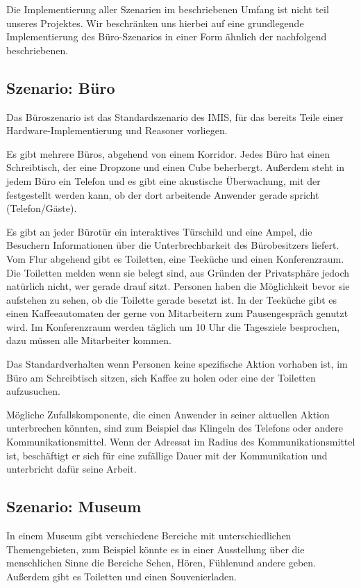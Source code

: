 Die Implementierung aller Szenarien im beschriebenen Umfang ist nicht teil unseres Projektes. Wir beschränken uns hierbei auf eine grundlegende Implementierung des Büro-Szenarios in einer Form ähnlich der nachfolgend beschriebenen. 

\subsection*{Szenario: Büro}

Das Büroszenario ist das Standardszenario des IMIS, für das bereits Teile einer Hardware-Implementierung und Reasoner vorliegen.

Es gibt mehrere Büros, abgehend von einem Korridor. Jedes Büro hat einen Schreibtisch, der eine Dropzone und einen Cube beherbergt. Außerdem steht in jedem Büro ein Telefon und es gibt eine akustische Überwachung, mit der festgestellt werden kann, ob der dort arbeitende Anwender gerade spricht (Telefon/Gäste). 

Es gibt an jeder Bürotür ein interaktives Türschild und eine Ampel, die Besuchern Informationen über die Unterbrechbarkeit des Bürobesitzers liefert.
Vom Flur abgehend gibt es Toiletten, eine Teeküche und einen Konferenzraum. Die Toiletten melden wenn sie belegt sind, aus Gründen der Privatsphäre jedoch natürlich nicht, wer gerade drauf sitzt. Personen haben die Möglichkeit bevor sie aufstehen zu sehen, ob die Toilette gerade besetzt ist. In der Teeküche gibt es einen Kaffeeautomaten der gerne von Mitarbeitern zum Pausengespräch genutzt wird. Im Konferenzraum werden täglich um 10 Uhr die Tagesziele besprochen, dazu müssen alle Mitarbeiter kommen.

Das Standardverhalten wenn Personen keine spezifische Aktion vorhaben ist, im Büro am Schreibtisch sitzen, sich Kaffee zu holen oder eine der Toiletten aufzusuchen.

Mögliche Zufallskomponente, die einen Anwender in seiner aktuellen Aktion unterbrechen könnten, sind zum Beispiel das Klingeln des Telefons oder andere Kommunikationsmittel. Wenn der Adressat im Radius des Kommunikationsmittel ist, beschäftigt er sich für eine zufällige Dauer mit der Kommunikation und unterbricht dafür seine Arbeit.

\subsection*{Szenario: Museum}
 
In einem Museum gibt verschiedene Bereiche mit unterschiedlichen Themengebieten, zum Beispiel könnte es in einer Ausstellung über die menschlichen Sinne die Bereiche \glqq Sehen\grqq , \glqq Hören\grqq, \glqq Fühlen\grqq und andere geben. Außerdem gibt es Toiletten und einen Souvenierladen.

